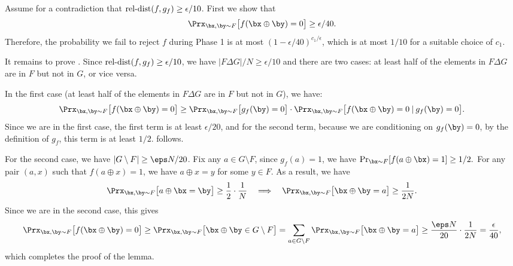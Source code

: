 \documentclass[11pt]{article}
\theoremstyle{definition}
\begin{document}
\begin{proofof}{}




Assume for a contradiction that  
 $\mathrm{rel}\text{-}\mathrm{dist}(f,g_f) \geq \epsilon/10$.
 First we show that  
\begin{equation}
\label{eq:hehe10}\Prx_{\bx,\by \sim F } \big[f(\bx \oplus \by) =0\big] \geq \epsilon/40.\end{equation}
Therefore,  the probability we fail to reject $f$ during Phase 1 is at most $(1-\epsilon/40)^{c_1/\epsilon}$, which is at most $1/10$ for a suitable choice of $c_1$. 


It remains to prove . Since $\mathrm{rel}\text{-}\mathrm{dist}(f,g_f) \geq \epsilon/10$, we have $|F \Delta G |/N \geq \epsilon/10$ and 
there are two cases: at least half of the elements in $F \Delta G $ are in $F $ but not in $G $, or vice versa. 




In the first case (at least half of the elements in $F \Delta G $ are in $F $ but not in $G $),  we have:
$$\Prx_{\bx,\by \sim F }\big[f(\bx \oplus \by)=0\big] \geq 
\Prx_{\bx, \by \sim F } \big[g_f(\by)=0\big] \cdot \Prx_{\bx,\by \sim F}\big[f(\bx \oplus \by)=0 \hspace{0.08cm}|\hspace{0.08cm} g_f(\by)=0\big].$$
Since we are in the first case, the first term is at least $\epsilon/20$, and for the second term, because we are conditioning on  $g_f(\by)=0$, by the definition of $g_f$, this term is at least $1/2$.  follows.



For the second case, we have $|G \setminus F | \geq \eps N / 20$. Fix any $a \in G \setminus F $, since $g_f(a)=1$, we have $\Pr_{\bx \sim F}[f(a \oplus \bx )=1] \geq 1/2.$
For any pair $(a,x)$ such that $f(a\oplus x )=1$, we have $a \oplus x =y$ for some $y \in F$. As a result, we have
\[
\Prx_{\bx,\by \sim F}\big[a \oplus \bx  = \by\big] \geq {\frac 1 2} \cdot {\frac 1 N}\quad\Longrightarrow\quad
\Prx_{\bx,\by \sim F}\big[\bx \oplus \by = a \big] \geq \frac{1}{2N}.
\]
Since we are in the second case, this gives
\[
\Prx_{\bx,\by \sim F}\big[f(\bx \oplus \by )=0 \big]
\ge \Prx_{\bx,\by \sim F}\big[ \bx \oplus \by\in G\setminus F\big]
=\sum_{a \in G \setminus F }\Prx_{\bx,\by \sim F}\big[\bx \oplus \by = a \big] \geq {\frac {\eps N} {20}}\cdot {\frac 1 {2N}}  = \frac{\epsilon}{40},
\]
which completes the proof of the lemma.
\end{proofof}
\end{document}
